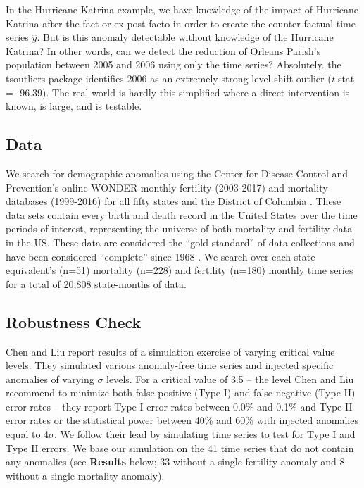 \documentclass[12pt]{article}
\begin{document}
In the Hurricane Katrina example, we have knowledge of the impact of
Hurricane Katrina after the fact or ex-post-facto in order to create the
counter-factual time series \(\hat{y}\). But is this anomaly detectable
without knowledge of the Hurricane Katrina? In other words, can we
detect the reduction of Orleans Parish's population between 2005 and
2006 using only the time series? Absolutely. the tsoutliers package
identifies 2006 as an extremely strong level-shift outlier
(\emph{t}-stat = -96.39). The real world is hardly this simplified where
a direct intervention is known, is large, and is testable.

\hypertarget{data}{%
\subsection{Data}\label{data}}

We search for demographic anomalies using the Center for Disease Control
and Prevention's online WONDER monthly fertility (2003-2017) and
mortality databases (1999-2016) for all fifty states and the District of
Columbia \citep{CDC_fert07, CDC_mort}. These data sets contain every
birth and death record in the United States over the time periods of
interest, representing the universe of both mortality and fertility data
in the US. These data are considered the ``gold standard'' of data
collections \citep{mahapatra2007civil} and have been considered
``complete'' since 1968 \citep{hetzel2016us}. We search over each state
equivalent's (n=51) mortality (n=228) and fertility (n=180) monthly time
series for a total of 20,808 state-months of data.

\hypertarget{robustness-check}{%
\subsection{Robustness Check}\label{robustness-check}}

Chen and Liu \citeyearpar{chen1993joint} report results of a simulation
exercise of varying critical value levels. They simulated various
anomaly-free time series and injected specific anomalies of varying
\(\sigma\) levels. For a critical value of 3.5 -- the level Chen and Liu
recommend to minimize both false-positive (Type I) and false-negative
(Type II) error rates -- they report Type I error rates between 0.0\%
and 0.1\% and Type II error rates or the statistical power between 40\%
and 60\% with injected anomalies equal to 4\(\sigma\). We follow their
lead by simulating time series to test for Type I and Type II errors. We
base our simulation on the 41 time series that do not contain any
anomalies (see \textbf{Results} below; 33 without a single fertility
anomaly and 8 without a single mortality anomaly).
\end{document}

